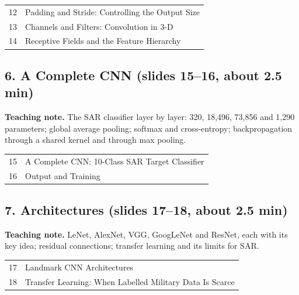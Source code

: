 \documentclass[11pt]{article}
\begin{document}
\begin{center}\small\renewcommand{\arraystretch}{1.1}\begin{tabularx}{\textwidth}{@{}r X@{}}12 & Padding and Stride: Controlling the Output Size\\
13 & Channels and Filters: Convolution in 3-D\\
14 & Receptive Fields and the Feature Hierarchy\\\end{tabularx}\end{center}

\subsection{6. A Complete CNN \normalfont\small\color{GreyN}(slides 15--16, about 2.5 min)}

\textbf{Teaching note.} The SAR classifier layer by layer: 320, 18,496, 73,856 and 1,290 parameters; global average pooling; softmax and cross-entropy; backpropagation through a shared kernel and through max pooling.

\begin{center}\small\renewcommand{\arraystretch}{1.1}\begin{tabularx}{\textwidth}{@{}r X@{}}15 & A Complete CNN: 10-Class SAR Target Classifier\\
16 & Output and Training\\\end{tabularx}\end{center}

\subsection{7. Architectures \normalfont\small\color{GreyN}(slides 17--18, about 2.5 min)}

\textbf{Teaching note.} LeNet, AlexNet, VGG, GoogLeNet and ResNet, each with its key idea; residual connections; transfer learning and its limits for SAR.

\begin{center}\small\renewcommand{\arraystretch}{1.1}\begin{tabularx}{\textwidth}{@{}r X@{}}17 & Landmark CNN Architectures\\
18 & Transfer Learning: When Labelled Military Data Is Scarce\\\end{tabularx}\end{center}
\end{document}
